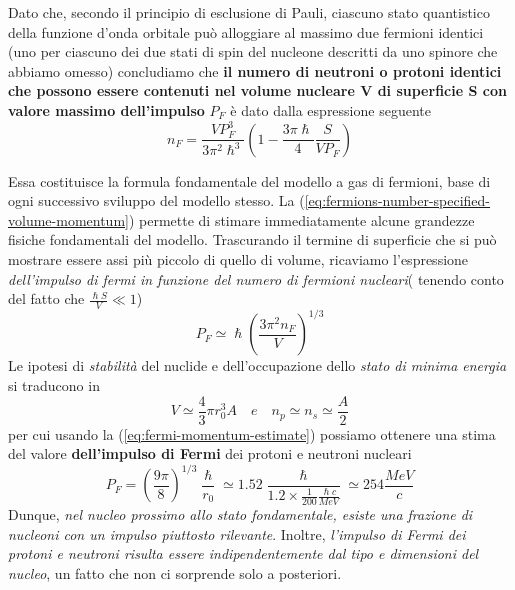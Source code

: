 Dato che, secondo il principio di esclusione di Pauli, ciascuno stato quantistico della funzione d’onda orbitale può alloggiare al massimo due fermioni identici (uno per ciascuno dei due stati di spin del nucleone descritti da uno spinore che abbiamo omesso) concludiamo che \textbf{il numero di neutroni o protoni identici che possono essere contenuti nel volume nucleare V di superficie S con valore massimo dell’impulso} $P_F$ è dato dalla espressione seguente
\begin{equation}
	n_{F} = \frac{V P_{F}^{3}}{3 \pi^{2}\hslash^{3}} \left( 1 - \frac{3\pi \hslash}{4} \frac{S}{VP_{F}} \right)
	\label{eq:fermions-number-specified-volume-momentum}
\end{equation}

Essa costituisce la formula fondamentale del modello a gas di fermioni, base di ogni successivo sviluppo del modello stesso.
La (\ref{eq:fermions-number-specified-volume-momentum}) permette di stimare immediatamente alcune grandezze fisiche fondamentali del modello. Trascurando il termine di superficie che si può mostrare essere assi più piccolo di quello di volume, ricaviamo l’espressione \emph{dell’impulso di fermi in funzione del numero di fermioni nucleari}( tenendo conto del fatto che $\frac{\hslash S}{V} \ll 1$)
\begin{equation}
	P_{F} \simeq \hslash \left(\frac{3\pi^{2}n_{F}}{V} \right)^{1/3}
	\label{eq:fermi-momentum-estimate}
\end{equation}
Le ipotesi di \emph{stabilità} del nuclide e dell'occupazione dello \emph{stato di minima energia} si traducono in
\[
	V \simeq \frac{4}{3}\pi r_{0}^{3}A \quad e \quad n_{p}\simeq n_{s} \simeq \frac{A}{2}
\]
per cui usando la (\ref{eq:fermi-momentum-estimate}) possiamo ottenere una stima del valore \textbf{dell’impulso di Fermi} dei protoni e neutroni nucleari
\[
P_{F} = \left( \frac{9\pi}{8} \right)^{1/3} \frac{\hslash}{r_{0}} \simeq 1.52 \frac{\hslash}{1.2 \times \frac{1}{200}\frac{\hslash c}{MeV}} \simeq 254 \frac{MeV}{c}
\]
Dunque, \emph{nel nucleo prossimo allo stato fondamentale, esiste una frazione di nucleoni con un impulso piuttosto rilevante}. Inoltre, \emph{l’impulso di Fermi dei protoni e neutroni risulta essere indipendentemente dal tipo e dimensioni del nucleo}, un fatto che non ci sorprende solo a posteriori.
\bigskip

